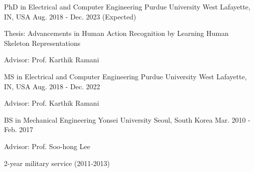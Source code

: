 


\begin{cventries}


    \cventry
    {PhD in Electrical and Computer Engineering} %
    {Purdue University} %
    {West Lafayette, IN, USA} %
    {Aug. 2018 - Dec. 2023 (Expected)} %
    { %
    \begin{cvitems}
        \item {Thesis: Advancements in Human Action Recognition by Learning Human Skeleton Representations}
        \item {Advisor: Prof. Karthik Ramani}
    \end{cvitems}
    }

    \cventry
    {MS in Electrical and Computer Engineering} %
    {Purdue University} %
    {West Lafayette, IN, USA} %
    {Aug. 2018 - Dec. 2022} %
    { %
    \begin{cvitems}
        \item {Advisor: Prof. Karthik Ramani}
    \end{cvitems}
    }

    \cventry
    {BS in Mechanical Engineering} %
    {Yonsei University} %
    {Seoul, South Korea} %
    {Mar. 2010 - Feb. 2017} %
    { %
    \begin{cvitems}
        \item {Advisor: Prof. Soo-hong Lee}
        \item {2-year military service (2011-2013)}
    \end{cvitems}
    }

\end{cventries}
